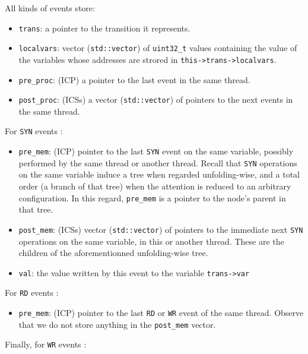 \documentclass{llncs}
\begin{document}
All kinds of events store:
\begin{itemize}
\item
  \verb!trans!: a pointer to the transition it represents.
\item
  \verb!localvars!: vector (\verb!std::vector!) of \verb!uint32_t! values
  containing the value of the variables whose addresses are strored in
  \verb!this->trans->localvars!.
\item
  \verb!pre_proc!: (ICP) a pointer to the last event in the same thread.
\item
  \verb!post_proc!: (ICSs) a vector (\verb!std::vector!) of pointers to
  the next events in the same thread.
\end{itemize}
%
For \verb!SYN! events :
\begin{itemize}
\item
  \verb!pre_mem!: (ICP) pointer to the last \verb!SYN! event on the same
  variable, possibly performed by the same thread or another thread.
  Recall that \verb!SYN! operations on the same variable induce a tree when
  regarded unfolding-wise, and a total order (a branch of that tree) when
  the attention is reduced to an arbitrary configuration.
  In this regard, \verb!pre_mem! is a pointer to the node's parent in that
  tree.
\item
  \verb!post_mem!: (ICSs) vector (\verb!std::vector!) of pointers to
  the immediate next \verb!SYN! operations on the same variable, in this or
  another thread. These are the children of the aforementionned
  unfolding-wise tree.
\item
  \verb!val!: the value written by this event to the variable \verb!trans->var!
\end{itemize}
%
For \verb!RD! events :
\begin{itemize}
\item
  \verb!pre_mem!: (ICP) pointer to the last \verb!RD! or \verb!WR! event of
  the same thread. Observe that we do not store anything in the
  \verb!post_mem! vector.
\end{itemize}
%
Finally, for \verb!WR! events :
\end{document}
